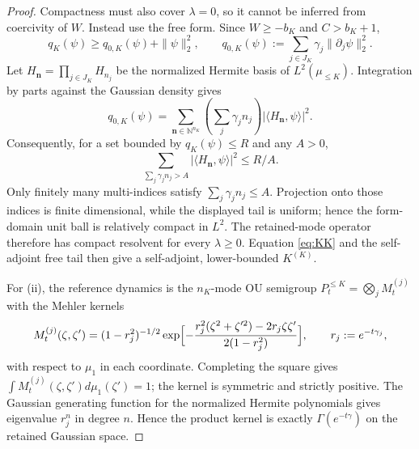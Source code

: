 \documentclass[11pt,a4paper]{article}
\theoremstyle{plain}
\theoremstyle{definition}
\newcommand{\muv}{\mu}
\newcommand{\Gam}{\Gamma}
\newcommand{\N}{\mathbb N}
\begin{document}
\begin{proof}
Compactness must also cover $\lambda=0$, so it cannot be inferred from
coercivity of $W$.  Instead use the free form.  Since $W\ge-b_K$ and
$C>b_K+1$,
\[
 q_K(\psi)\ge
 q_{0,K}(\psi)+\|\psi\|_2^2,
 \qquad q_{0,K}(\psi):=\sum_{j\in J_K}\gamma_j\|\partial_j\psi\|_2^2.
\]
Let $H_{\boldsymbol n}=\prod_{j\in J_K}H_{n_j}$ be the normalized Hermite
basis of $L^2(\muv_{\le K})$.  Integration by parts against the Gaussian
density gives
\[
 q_{0,K}(\psi)=
 \sum_{\boldsymbol n\in\N^{n_K}}
 \left(\sum_j\gamma_jn_j\right)
 |\langle H_{\boldsymbol n},\psi\rangle|^2.
\]
Consequently, for a set bounded by $q_K(\psi)\le R$ and any $A>0$,
\[
 \sum_{\sum_j\gamma_jn_j>A}
 |\langle H_{\boldsymbol n},\psi\rangle|^2\le R/A.
\]
Only finitely many multi-indices satisfy $\sum_j\gamma_jn_j\le A$.
Projection onto those indices is finite dimensional, while the displayed tail
is uniform; hence the form-domain unit ball is relatively compact in $L^2$.
The retained-mode operator therefore has compact resolvent for every
$\lambda\ge0$.  Equation \eqref{eq:KK} and the self-adjoint free tail then give
a self-adjoint, lower-bounded $K^{(K)}$.

For (ii), the reference dynamics is the $n_K$-mode OU semigroup
$P^{\le K}_t=\bigotimes_j M^{(j)}_t$ with the Mehler kernels
\begin{equation}
 M^{(j)}_t(\zeta,\zeta')
 =(1-r_j^2)^{-1/2}
 \exp\Bigl[-\frac{r_j^2(\zeta^2+\zeta'^2)-2r_j\zeta\zeta'}
 {2(1-r_j^2)}\Bigr],
 \qquad r_j:=e^{-t\gamma_j},
 \label{eq:mehlermu}
\end{equation}
with respect to $\muv_1$ in each coordinate.  Completing the square gives
$\int M_t^{(j)}(\zeta,\zeta')d\muv_1(\zeta')=1$; the kernel is symmetric and
strictly positive.  The Gaussian generating function for the normalized
Hermite polynomials gives eigenvalue $r_j^n$ in degree $n$.  Hence the product
kernel is exactly $\Gam(e^{-t\gamma})$ on the retained Gaussian space.


\end{proof}
\end{document}
